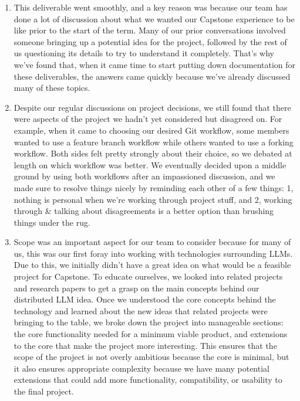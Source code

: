 \documentclass{article}
\begin{document}
\begin{enumerate}
    \item This deliverable went smoothly, and a key reason was because our team
has done a lot of discussion about what we wanted our Capstone experience to be
like prior to the start of the term. Many of our prior conversations involved
someone bringing up a potential idea for the project, followed by the rest of us
questioning its details to try to understand it completely. That's why we've found
that, when it came time to start putting down documentation for these deliverables,
the answers came quickly because we've already discussed many of these topics.

    \item Despite our regular discussions on project decisions, we still found
that there were aspects of the project we hadn't yet considered but disagreed on.
For example, when it came to choosing our desired Git workflow, some members wanted to
use a feature branch workflow while others wanted to use a forking workflow. Both
sides felt pretty strongly about their choice, so we debated at length on which workflow
was better. We eventually decided upon a middle ground by using both workflows after
an impassioned discussion, and we made sure to resolve things nicely by reminding each
other of a few things: 1, nothing is personal when we're working through project stuff,
and 2, working through \& talking about disagreements is a better option than brushing
things under the rug.

    \item Scope was an important aspect for our team to consider because for many
of us, this was our first foray into working with technologies surrounding LLMs.
Due to this, we initially didn't have a great idea on what would be a feasible project
for Capstone. To educate ourselves, we looked into related projects and research papers
to get a grasp on the main concepts behind our distributed LLM idea. Once we understood
the core concepts behind the technology and learned about the new ideas that related
projects were bringing to the table, we broke down the project into manageable sections:
the core functionality needed for a minimum viable product, and extensions to the core
that make the project more interesting. This ensures that the scope of the project is not overly
ambitious because the core is minimal, but it also ensures appropriate complexity because
we have many potential extensions that could add more functionality, compatibility, or
usability to the final project.
\end{enumerate}  
\end{document}
